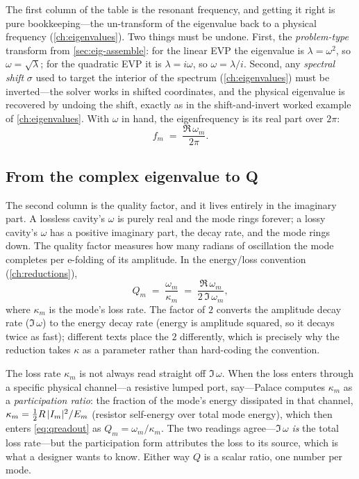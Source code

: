 The first column of the table is the resonant frequency, and getting it right is
pure bookkeeping---the un-transform of the eigenvalue back to a physical
frequency (\cref{ch:eigenvalues}). Two things must be undone. First, the
\emph{problem-type} transform from \cref{sec:eig-assemble}: for the linear EVP
the eigenvalue is $\lambda=\omega^2$, so $\omega=\sqrt\lambda$; for the quadratic
EVP it is $\lambda=i\omega$, so $\omega=\lambda/i$. Second, any \emph{spectral
shift} $\sigma$ used to target the interior of the spectrum
(\cref{ch:eigenvalues}) must be inverted---the solver works in shifted
coordinates, and the physical eigenvalue is recovered by undoing the shift,
exactly as in the shift-and-invert worked example of \cref{ch:eigenvalues}. With
$\omega$ in hand, the eigenfrequency is its real part over $2\pi$:
\begin{equation}
  f_m \;=\; \frac{\Re\,\omega_m}{2\pi}.
  \label{eq:freadout}
\end{equation}

\subsection{From the complex eigenvalue to Q}

The second column is the quality factor, and it lives entirely in the imaginary
part. A lossless cavity's $\omega$ is purely real and the mode rings forever; a
lossy cavity's $\omega$ has a positive imaginary part, the decay rate, and the
mode rings down. The quality factor measures how many radians of oscillation the
mode completes per e-folding of its amplitude. In the energy/loss convention
(\cref{ch:reductions}),
\begin{equation}
  Q_m \;=\; \frac{\omega_m}{\kappa_m}
        \;=\; \frac{\Re\,\omega_m}{2\,\Im\,\omega_m},
  \label{eq:qreadout}
\end{equation}
where $\kappa_m$ is the mode's loss rate. The factor of $2$ converts the
amplitude decay rate ($\Im\,\omega$) to the energy decay rate (energy is
amplitude squared, so it decays twice as fast); different texts place the $2$
differently, which is precisely why the reduction takes $\kappa$ as a parameter
rather than hard-coding the convention.

\begin{notationbox}
The loss rate $\kappa_m$ is not always read straight off $\Im\,\omega$. When the
loss enters through a specific physical channel---a resistive lumped port, say---Palace
computes $\kappa_m$ as a \emph{participation ratio}: the fraction of the mode's
energy dissipated in that channel, $\kappa_m=\tfrac12 R\,\lvert I_m\rvert^2/E_m$ (resistor
self-energy over total mode energy), which then enters \cref{eq:qreadout} as
$Q_m=\omega_m/\kappa_m$. The two readings agree---$\Im\,\omega$ \emph{is} the
total loss rate---but the participation form attributes the loss to its source,
which is what a designer wants to know. Either way $Q$ is a scalar ratio, one
number per mode.
\end{notationbox}

